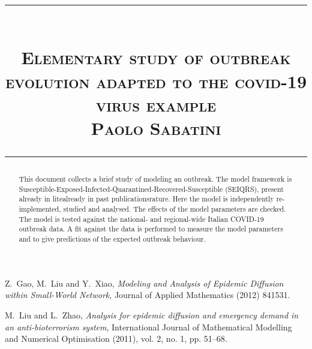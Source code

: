 \documentclass{article}
\title{
\begin{flushleft}
\rule{\textwidth}{1pt}\\
  \textsc{\textbf{Elementary study of outbreak evolution adapted to the covid-19 virus example 	}}\\[2mm]
\textsc{\large Paolo Sabatini}\\
\rule{\textwidth}{1pt}
  \end{flushleft}
}
\date{}
\begin{document}
\maketitle


\begin{abstract}
This document collects a brief study of modeling an outbreak. The model framework is Susceptible-Exposed-Infected-Quarantined-Recovered-Susceptible (SEIQRS), present already in litealready in past publicationsrature. Here the model is independently re-implemented, studied and analysed. The effects of the model parameters are checked. The model is tested against the national- and regional-wide Italian COVID-19 outbreak data. A fit against the data is performed to measure the model parameters and to give predictions of the expected outbreak behaviour.
\end{abstract}
\vspace{2cm}
\tableofcontents

\newpage







\begin{thebibliography}{9}
Z.~Gao, M.~Liu and Y.~Xiao, 
\textit{Modeling and Analysis of Epidemic Diffusion within Small-World Network},
Journal of Applied Mathematics (2012) 841531.

M.~Liu and L.~Zhao, 
\textit{Analysis for epidemic diffusion and emergency demand in an anti-bioterrorism
system},
International Journal of Mathematical Modelling and Numerical Optimisation (2011), vol. 2, no. 1, pp. 51–68.
\end{thebibliography}
\end{document}
